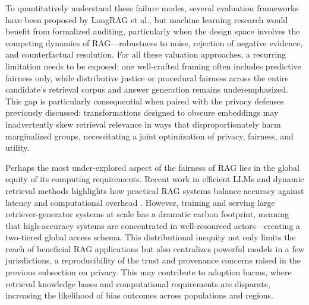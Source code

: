 \documentclass[11pt,a4paper]{article}
\begin{document}
To quantitatively understand these failure modes, several evaluation frameworks have been proposed by LongRAG et al., but machine learning research would benefit from formalized auditing, particularly when the design space involves the competing dynamics of RAG---robustness to noise, rejection of negative evidence, and counterfactual resolution. For all these valuation approaches, a recurring limitation needs to be exposed: one well-crafted framing often includes predictive fairness only, while distributive justice or procedural fairness across the entire candidate's retrieval corpus and answer generation remains underemphasized. This gap is particularly consequential when paired with the privacy defenses previously discussed: transformations designed to obscure embeddings may inadvertently skew retrieval relevance in ways that disproportionately harm marginalized groups, necessitating a joint optimization of privacy, fairness, and utility.

Perhaps the most under-explored aspect of the fairness of RAG lies in the global equity of its computing requirements. Recent work in efficient LLMs and dynamic retrieval methods highlights how practical RAG systems balance accuracy against latency and computational overhead \cite{arxiv:2312.03863v3,arxiv:2403.14403v2,arxiv:2404.12457v2}. However, training and serving large retriever-generator systems at scale has a dramatic carbon footprint, meaning that high-accuracy systems are concentrated in well-resourced actors---creating a two-tiered global access schema. This distributional inequity not only limits the reach of beneficial RAG applications but also centralizes powerful models in a few jurisdictions, a reproducibility of the trust and provenance concerns raised in the previous subsection on privacy. This may contribute to adoption harms, where retrieval knowledge bases and computational requirements are disparate, increasing the likelihood of bias outcomes across populations and regions.
\end{document}
